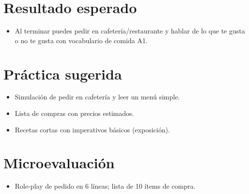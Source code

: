 \section{Resultado esperado}
\begin{itemize}[leftmargin=*]
	\item Al terminar puedes pedir en cafetería/restaurante y hablar de lo que te gusta o no te gusta con vocabulario de comida A1.
\end{itemize}

\section{Práctica sugerida}
\begin{itemize}[leftmargin=*]
	\item Simulación de pedir en cafetería y leer un menú simple.
	\item Lista de compras con precios estimados.
	\item Recetas cortas con imperativos básicos (exposición).
\end{itemize}

\section{Microevaluación}
\begin{itemize}[leftmargin=*]
	\item Role-play de pedido en 6 líneas; lista de 10 ítems de compra.
\end{itemize}
